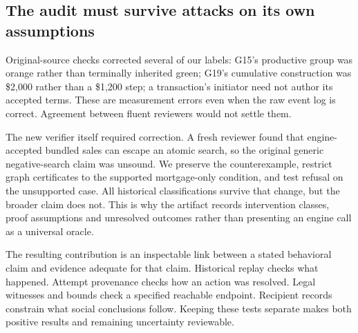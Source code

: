 \subsection{The audit must survive attacks on its own assumptions}

Original-source checks corrected several of our labels: G15's productive group was orange rather than terminally inherited green; G19's cumulative construction was \$2,000 rather than a \$1,200 step; a transaction's initiator need not author its accepted terms. These are measurement errors even when the raw event log is correct. Agreement between fluent reviewers would not settle them.

The new verifier itself required correction. A fresh reviewer found that engine-accepted bundled sales can escape an atomic search, so the original generic negative-search claim was unsound. We preserve the counterexample, restrict graph certificates to the supported mortgage-only condition, and test refusal on the unsupported case. All historical classifications survive that change, but the broader claim does not. This is why the artifact records intervention classes, proof assumptions and unresolved outcomes rather than presenting an engine call as a universal oracle.

The resulting contribution is an inspectable link between a stated behavioral claim and evidence adequate for that claim. Historical replay checks what happened. Attempt provenance checks how an action was resolved. Legal witnesses and bounds check a specified reachable endpoint. Recipient records constrain what social conclusions follow. Keeping these tests separate makes both positive results and remaining uncertainty reviewable.

